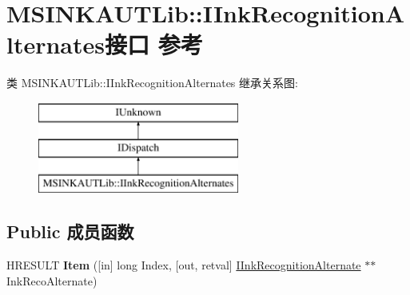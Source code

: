 \hypertarget{interface_m_s_i_n_k_a_u_t_lib_1_1_i_ink_recognition_alternates}{}\section{M\+S\+I\+N\+K\+A\+U\+T\+Lib\+:\+:I\+Ink\+Recognition\+Alternates接口 参考}
\label{interface_m_s_i_n_k_a_u_t_lib_1_1_i_ink_recognition_alternates}
类 M\+S\+I\+N\+K\+A\+U\+T\+Lib\+:\+:I\+Ink\+Recognition\+Alternates 继承关系图\+:\begin{figure}[H]
\begin{center}
\leavevmode
\includegraphics[height=3.000000cm]{interface_m_s_i_n_k_a_u_t_lib_1_1_i_ink_recognition_alternates}
\end{center}
\end{figure}
\subsection*{Public 成员函数}
\begin{DoxyCompactItemize}
\item 
\mbox{\label{interface_m_s_i_n_k_a_u_t_lib_1_1_i_ink_recognition_alternates_a33a15ca5c6ae70d0d82a92f04b9e8ec1}} 
H\+R\+E\+S\+U\+LT {\bfseries Item} (\mbox{[}in\mbox{]} long Index, \mbox{[}out, retval\mbox{]} \hyperlink{interface_m_s_i_n_k_a_u_t_lib_1_1_i_ink_recognition_alternate}{I\+Ink\+Recognition\+Alternate} $\ast$$\ast$Ink\+Reco\+Alternate)
\end{DoxyCompactItemize}
